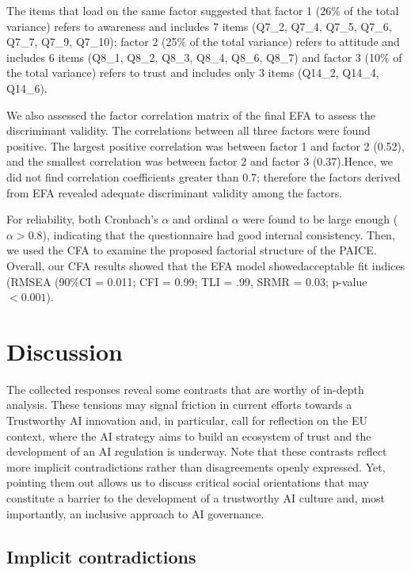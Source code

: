 \documentclass{article}
\begin{document}
The items that load on the same factor suggested that factor 1 (26\% of the total variance) refers to awareness and includes 7 items (Q7\_2, Q7\_4, Q7\_5, Q7\_6, Q7\_7, Q7\_9, Q7\_10); factor 2 (25\% of the total variance) refers to attitude and includes 6 items (Q8\_1, Q8\_2, Q8\_3, Q8\_4, Q8\_6, Q8\_7) and factor 3 (10\% of the total variance) refers to trust and includes only 3 items (Q14\_2, Q14\_4, Q14\_6).

We also assessed the factor correlation matrix of the final EFA to assess the discriminant validity. The correlations between all three factors were found positive. The largest positive correlation was between factor 1 and factor 2 (0.52), and the smallest correlation was between factor 2 and factor 3 (0.37).Hence, we did not find correlation coefficients greater than 0.7; therefore the factors derived from EFA revealed adequate discriminant validity among the factors.

For reliability, both Cronbach’s $\alpha$ and ordinal $\alpha$ were found to be large enough ($\alpha > 0.8$), indicating that the questionnaire had good internal consistency. Then, we used the CFA to examine the proposed factorial structure of the PAICE.
Overall, our CFA results showed that the EFA model showedacceptable fit indices (RMSEA (90\%CI = 0.011; CFI = 0.99; TLI = .99, SRMR = 0.03; p-value $<0.001$).

\section{Discussion}
\label{discuss}

The collected responses reveal some contrasts that are worthy of in-depth analysis. These tensions may signal friction in current efforts towards a Trustworthy AI innovation and, in particular, call for reflection on the EU context, where the AI strategy aims to build an ecosystem of trust and the development of an AI regulation is underway.
Note that these contrasts reflect more implicit contradictions rather than disagreements openly expressed. 
Yet, pointing them out allows us to discuss critical social orientations that may constitute a barrier to the development of a trustworthy AI culture and, most importantly, an inclusive approach to AI governance.

\subsection{Implicit contradictions}
\end{document}
